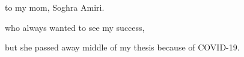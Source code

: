 \begin{dedication}
to my mom, Soghra Amiri.

who always wanted to see my success,

but she passed away middle of my thesis because of COVID-19.
\end{dedication}